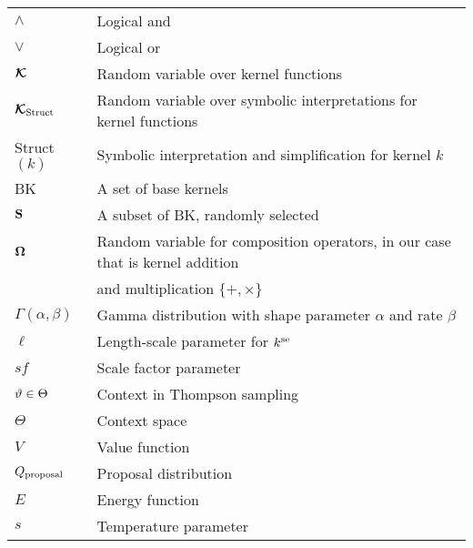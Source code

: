 \begin{tabular}{l l}
$\land$                &  Logical and \\
$\lor$                 &  Logical or \\
$\bm{\mathcal{K}}$			& Random variable over kernel functions \\
$\bm{\mathcal{K}}_\text{Struct}$			& Random variable over symbolic interpretations for
kernel functions \\
Struct$(k)$		& Symbolic interpretation and simplification for kernel $k$ \\
BK			& A set of base kernels \\
$\mathbf{S}$			& A subset of BK, randomly selected \\
$\bm{\Omega}$		& Random variable for composition operators, in our
case that is kernel addition\\
&and multiplication $\{+,\times\}$\\
$\Gamma(\alpha,\beta)$ & Gamma distribution with shape parameter $\alpha$ and
rate $\beta$ \\

$\ell$			& Length-scale parameter for $k^\text{se}$  \\
$sf$			& Scale factor parameter\\
$\vartheta \in \Theta$    & Context in Thompson sampling\\ 
$\Theta$    & Context space\\ 
$V$			& Value function\\
$Q_{\textrm{proposal}}$		& Proposal distribution\\
$E$			& Energy function\\
$s$			& Temperature parameter \\
\end{tabular}
